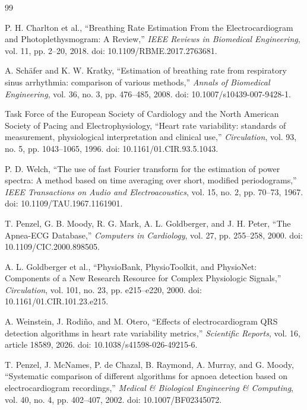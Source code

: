 \documentclass[a4paper,10.5pt,oneside]{report}
\begin{document}
\clearpage
{}
\begin{thebibliography}{99}

P. H. Charlton et al., ``Breathing Rate Estimation From the Electrocardiogram and Photoplethysmogram: A Review,'' \textit{IEEE Reviews in Biomedical Engineering}, vol. 11, pp. 2--20, 2018. doi: 10.1109/RBME.2017.2763681.

A. Sch\"afer and K. W. Kratky, ``Estimation of breathing rate from respiratory sinus arrhythmia: comparison of various methods,'' \textit{Annals of Biomedical Engineering}, vol. 36, no. 3, pp. 476--485, 2008. doi: 10.1007/s10439-007-9428-1.

Task Force of the European Society of Cardiology and the North American Society of Pacing and Electrophysiology, ``Heart rate variability: standards of measurement, physiological interpretation and clinical use,'' \textit{Circulation}, vol. 93, no. 5, pp. 1043--1065, 1996. doi: 10.1161/01.CIR.93.5.1043.

P. D. Welch, ``The use of fast Fourier transform for the estimation of power spectra: A method based on time averaging over short, modified periodograms,'' \textit{IEEE Transactions on Audio and Electroacoustics}, vol. 15, no. 2, pp. 70--73, 1967. doi: 10.1109/TAU.1967.1161901.

T. Penzel, G. B. Moody, R. G. Mark, A. L. Goldberger, and J. H. Peter, ``The Apnea-ECG Database,'' \textit{Computers in Cardiology}, vol. 27, pp. 255--258, 2000. doi: 10.1109/CIC.2000.898505.

A. L. Goldberger et al., ``PhysioBank, PhysioToolkit, and PhysioNet: Components of a New Research Resource for Complex Physiologic Signals,'' \textit{Circulation}, vol. 101, no. 23, pp. e215--e220, 2000. doi: 10.1161/01.CIR.101.23.e215.

A. Weinstein, J. Rodi\~no, and M. Otero, ``Effects of electrocardiogram QRS detection algorithms in heart rate variability metrics,'' \textit{Scientific Reports}, vol. 16, article 18589, 2026. doi: 10.1038/s41598-026-49215-6.

T. Penzel, J. McNames, P. de Chazal, B. Raymond, A. Murray, and G. Moody, ``Systematic comparison of different algorithms for apnoea detection based on electrocardiogram recordings,'' \textit{Medical \& Biological Engineering \& Computing}, vol. 40, no. 4, pp. 402--407, 2002. doi: 10.1007/BF02345072.


\end{thebibliography}
\end{document}
